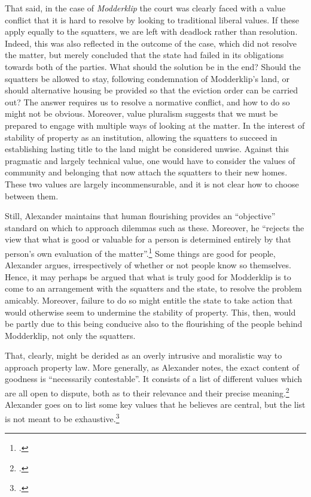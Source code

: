 That said, in the case of {\it Modderklip} the court was clearly faced with a value conflict that it is hard to resolve by looking to traditional liberal values. If these apply equally to the squatters, we are left with deadlock rather than resolution. Indeed, this was also reflected in the outcome of the case, which did not resolve the matter, but merely concluded that the state had failed in its obligations towards both of the parties. What should the solution be in the end? Should the squatters be allowed to stay, following condemnation of Modderklip's land, or should alternative housing be provided so that the eviction order can be carried out? The answer requires us to resolve a normative conflict, and how to do so might not be obvious. Moreover, value pluralism suggests that we must be prepared to engage with multiple ways of looking at the matter. In the interest of stability of property as an institution, allowing the squatters to succeed in establishing lasting title to the land might be considered unwise. Against this pragmatic and largely technical value, one would have to consider the values of community and belonging that now attach the squatters to their new homes. These two values are largely incommensurable, and it is not clear how to choose between them.

Still, Alexander maintains that human flourishing provides an ``objective'' standard on which to approach dilemmas such as these. Moreover, he ``rejects the view that what is good or valuable for a person is determined entirely by that person's own evaluation of the matter''.\footcite[1263]{alexander14} Some things are good for people, Alexander argues, irrespectively of whether or not people know so themselves. Hence, it may perhaps be argued that what is truly good for Modderklip is to come to an arrangement with the squatters and the state, to resolve the problem amicably. Moreover, failure to do so might entitle the state to take action that would otherwise seem to undermine the stability of property. This, then, would be partly due to this being conducive also to the flourishing of the people behind Modderklip, not only the squatters.

That, clearly, might be derided as an overly intrusive and moralistic way to approach property law. More generally, as Alexander notes, the exact content of goodness is ``necessarily contestable''. It consists of a list of different values which are all open to dispute, both as to their relevance and their precise meaning.\footcite[1263]{alexander14} Alexander goes on to list some key values that he believes are central, but the list is not meant to be exhaustive.\footcite[1764-1776]{alexander14}

